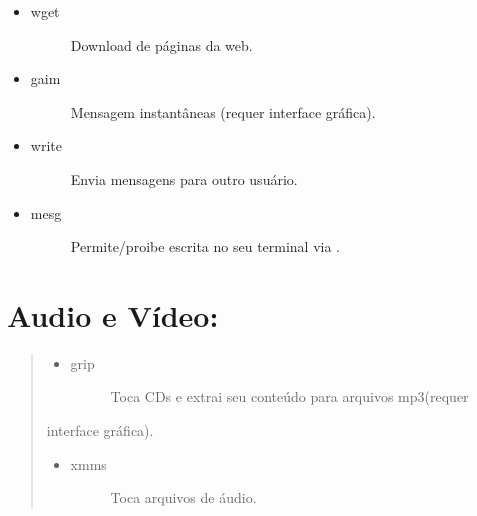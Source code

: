 \documentclass[a4paper,10pt,brazil]{sphinxmanual}
\begin{document}
\begin{itemize}
\begin{description}
\end{description}

\item {} \begin{description}
\item[{wget}] \leavevmode
Download de páginas da web.

\end{description}

\item {} \begin{description}
\item[{gaim}] \leavevmode
Mensagem instantâneas (requer interface gráfica).

\end{description}

\item {} \begin{description}
\item[{write}] \leavevmode
Envia mensagens para outro usuário.

\end{description}

\item {} \begin{description}
\item[{mesg}] \leavevmode
Permite/proibe escrita no seu terminal via .

\end{description}

\end{itemize}


\section{Audio e Vídeo:}
\label{unix:audio-e-video}\begin{quote}
\begin{itemize}
\item {} \begin{description}
\item[{grip}] \leavevmode
Toca CDs e extrai seu conteúdo para arquivos mp3(requer

\end{description}

\end{itemize}

interface gráfica).
\begin{itemize}
\item {} \begin{description}
\item[{xmms}] \leavevmode
Toca arquivos de áudio.

\end{description}

\end{itemize}
\end{quote}
\end{document}
